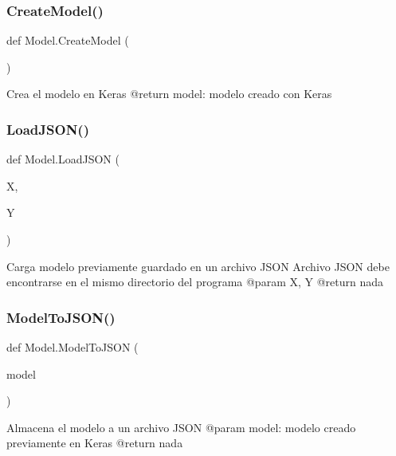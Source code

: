 \subsubsection{\texorpdfstring{Create\+Model()}{CreateModel()}}
{\footnotesize\ttfamily def Model.\+Create\+Model (\begin{DoxyParamCaption}{ }\end{DoxyParamCaption})}

\begin{DoxyVerb}Crea el modelo en Keras
@return model: modelo creado con Keras
\end{DoxyVerb}
 \mbox{\label{namespace_model_ab5aefd3f4349b6970ea3fc77e0aed9c8}} 
\subsubsection{\texorpdfstring{Load\+J\+S\+O\+N()}{LoadJSON()}}
{\footnotesize\ttfamily def Model.\+Load\+J\+S\+ON (\begin{DoxyParamCaption}\item[{}]{X,  }\item[{}]{Y }\end{DoxyParamCaption})}

\begin{DoxyVerb}Carga modelo previamente guardado en un archivo JSON
Archivo JSON debe encontrarse en el mismo directorio del programa
@param X, Y
@return nada
\end{DoxyVerb}
 \mbox{\label{namespace_model_a00000312b074c9b8f27c20faf6142dc6}} 
\subsubsection{\texorpdfstring{Model\+To\+J\+S\+O\+N()}{ModelToJSON()}}
{\footnotesize\ttfamily def Model.\+Model\+To\+J\+S\+ON (\begin{DoxyParamCaption}\item[{}]{model }\end{DoxyParamCaption})}

\begin{DoxyVerb}Almacena el modelo a un archivo JSON
@param model: modelo creado previamente en Keras
@return nada
\end{DoxyVerb}
 

